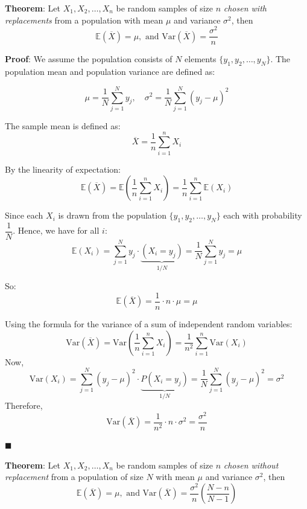 \documentclass[twoside]{book}
\begin{document}
\begin{textbox}
\textbf{Theorem}: Let $X_1 , X_2, \dots , X_n$ be random samples of size $n$ \textit{chosen with replacements} from a population with mean $\mu$ and variance $\sigma^2$, then
$$\mathbb{E}(\overline{X}) = \mu,  \text{ and } \mathrm{Var}(\overline{X}) = \dfrac{\sigma^2}{n}$$
\end{textbox}

\textbf{Proof}: We assume the population consists of $N$ elements $\{y_1, y_2, \dots, y_N\}$. The population mean and population variance are defined as:

$$\mu = \dfrac{1}{N}\sum_{j=1}^N y_j, \quad \sigma^2 = \dfrac{1}{N}\sum_{j=1}^N (y_j - \mu)^2$$

The sample mean is defined as:
\[
\overline{X} = \frac{1}{n} \sum_{i=1}^{n} X_i
\]

By the linearity of expectation:
\[
\mathbb{E}(\overline{X}) = \mathbb{E}\left( \frac{1}{n} \sum_{i=1}^{n} X_i \right) = \frac{1}{n} \sum_{i=1}^{n} \mathbb{E}(X_i)
\]

Since each \( X_i \) is drawn from the population $\{y_1, y_2, \dots, y_N\}$ each with probability $\dfrac{1}{N}$. Hence, we have for all $i$:
\[
\mathbb{E}(X_i) = \sum_{j=1}^N y_j \cdot \underbrace{(X_i = y_j)}_{1/N}
 = \dfrac{1}{N}\sum_{j=1}^N y_j  = \mu
\]

So:
\[
\mathbb{E}(\overline{X}) = \frac{1}{n} \cdot n \cdot \mu = \mu
\]

Using the formula for the variance of a sum of independent random variables:
\[
\mathrm{Var}(\overline{X}) = \mathrm{Var} \left( \frac{1}{n} \sum_{i=1}^{n} X_i \right) = \frac{1}{n^2} \sum_{i=1}^{n} \mathrm{Var}(X_i)
\]
Now,
$$\mathrm{Var}(X_i) = \sum_{j=1}^N (y_j - \mu)^2 \cdot \underbrace{P(X_i = y_j)}_{1/N} = \dfrac{1}{N}\sum_{j=1}^N (y_j - \mu)^2 = \sigma^2$$
Therefore,
\[
\mathrm{Var}(\overline{X}) = \frac{1}{n^2} \cdot n \cdot \sigma^2 = \frac{\sigma^2}{n}
\]



\hfill $\blacksquare$

\begin{textbox}
\textbf{Theorem}: Let $X_1 , X_2, \dots , X_n$ be random samples of size $n$ \textit{chosen without replacement} from a population of size $N$ with mean $\mu$ and variance $\sigma^2$, then
$$\mathbb{E}(\overline{X}) = \mu,  \text{ and } \mathrm{Var}(\overline{X}) = \dfrac{\sigma^2}{n}\left(\dfrac{N-n}{N-1}\right)$$
\end{textbox}
\end{document}
